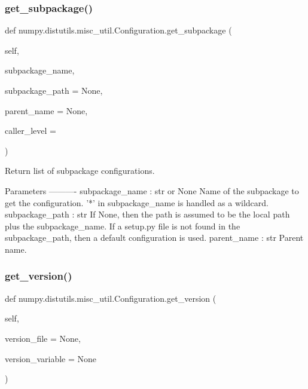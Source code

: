 \subsubsection{\texorpdfstring{get\+\_\+subpackage()}{get\_subpackage()}}
{\footnotesize\ttfamily def numpy.\+distutils.\+misc\+\_\+util.\+Configuration.\+get\+\_\+subpackage (\begin{DoxyParamCaption}\item[{}]{self,  }\item[{}]{subpackage\+\_\+name,  }\item[{}]{subpackage\+\_\+path = {\ttfamily None},  }\item[{}]{parent\+\_\+name = {\ttfamily None},  }\item[{}]{caller\+\_\+level = {} }\end{DoxyParamCaption})}

\begin{DoxyVerb}Return list of subpackage configurations.

Parameters
----------
subpackage_name : str or None
    Name of the subpackage to get the configuration. '*' in
    subpackage_name is handled as a wildcard.
subpackage_path : str
    If None, then the path is assumed to be the local path plus the
    subpackage_name. If a setup.py file is not found in the
    subpackage_path, then a default configuration is used.
parent_name : str
    Parent name.
\end{DoxyVerb}
 \mbox{\label{classnumpy_1_1distutils_1_1misc__util_1_1Configuration_ae4125bcd75a775e0caa2d4675e6a22cc}} 
\subsubsection{\texorpdfstring{get\+\_\+version()}{get\_version()}}
{\footnotesize\ttfamily def numpy.\+distutils.\+misc\+\_\+util.\+Configuration.\+get\+\_\+version (\begin{DoxyParamCaption}\item[{}]{self,  }\item[{}]{version\+\_\+file = {\ttfamily None},  }\item[{}]{version\+\_\+variable = {\ttfamily None} }\end{DoxyParamCaption})}

